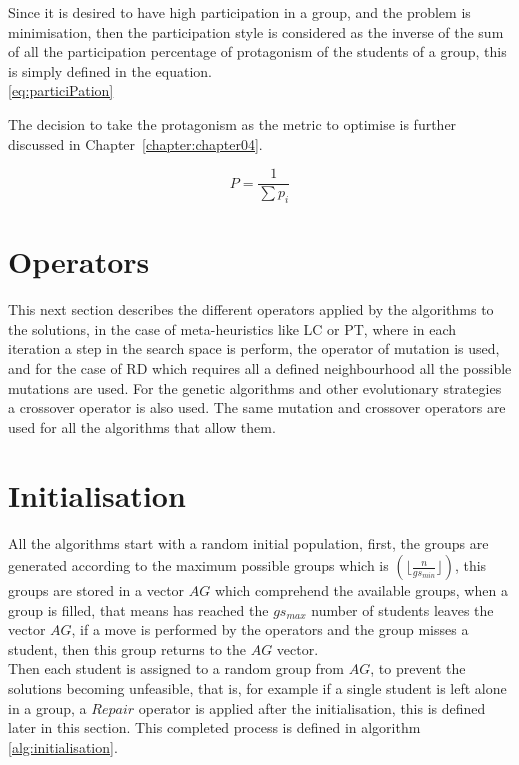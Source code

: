 Since it is desired to have high participation in a group, and the problem is minimisation, then the participation style is considered as the inverse of the sum of all the participation percentage of protagonism of the students of a group, this is simply defined in the equation.\\ \ref{eq:particiPation}

The decision to take the protagonism as the metric to optimise is further discussed in Chapter~\ref{chapter:chapter04}.

\begin{equation}
    \label{eq:particiPation}
    P = \frac{1}{\sum p_i} 
\end{equation}

\section{Operators} \label{sec:operators}

This next section describes the different operators applied by the algorithms to the solutions, in the case of meta-heuristics like LC or PT, where in each iteration a step in the search space is perform, the operator of mutation is used, and for the case of RD which requires all a defined neighbourhood all the possible mutations are used. For the genetic algorithms and other evolutionary strategies a crossover operator is also used. The same mutation and crossover operators are used for all the algorithms that allow them.\\

\section{Initialisation}

All the algorithms start with a random initial population, first, the groups are generated according to the maximum possible groups which is $(\lfloor\frac{n}{gs_{min}}\rfloor)$, this groups are stored in a vector $AG$ which comprehend the available groups, when a group is filled, that means has reached the $gs_{max}$ number of students leaves the vector $AG$, if a move is performed by the operators and the group misses a student, then this group returns to the $AG$ vector.\\

Then each student is assigned to a random group from $AG$, to prevent the solutions becoming unfeasible, that is, for example if a single student is left alone in a group, a $Repair$ operator is applied after the initialisation, this is defined later in this section. This completed process is defined in algorithm \ref{alg:initialisation}.\\

